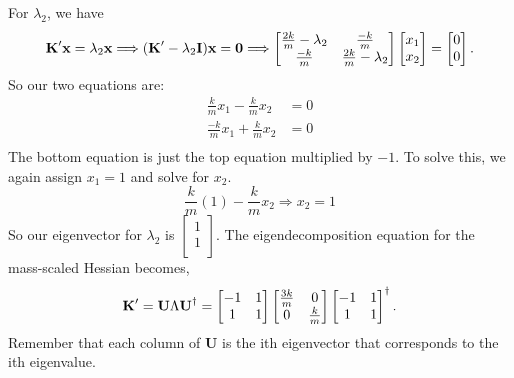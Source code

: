 \documentclass{article}
\newcommand{\be}{\begin{equation}}
\newcommand{\ee}{\end{equation}}
\newcommand{\bK}{\mbox{\bf K}}
\begin{document}
For $\lambda_2$, we have
\be
  \bK' \textbf{x} = \lambda_2 \textbf{x} \Longrightarrow (\bK' - \lambda_2 \textbf{I}) \textbf{x} = \textbf{0} \Longrightarrow
  \begin{bmatrix}
    \frac{2k}{m} - \lambda_2 & \frac{-k}{m} \\
    \frac{-k}{m} & \frac{2k}{m} - \lambda_2 \\
  \end{bmatrix}
  \begin{bmatrix}
    x_1 \\
    x_2 \\
  \end{bmatrix}
  =
  \begin{bmatrix}
    0 \\
    0 \\
  \end{bmatrix} .
\ee
So our two equations are:
\be
  \begin{split}
    \frac{k}{m}x_1 - \frac{k}{m}x_2 &= 0 \\
    \frac{-k}{m}x_1 + \frac{k}{m}x_2 &= 0 \\
  \end{split}
\ee
The bottom equation is just the top equation multiplied by $-1$. To solve this, we again assign $x_1 = 1$ and solve for $x_2$.
\be
  \frac{k}{m}(1) - \frac{k}{m}x_2 \Longrightarrow x_2 = 1
\ee
So our eigenvector for $\lambda_2$ is $\begin{bmatrix} 1 \\ 1 \\ \end{bmatrix}$. The eigendecomposition equation for the mass-scaled Hessian becomes,
\be
  \bK' = \textbf{U} \Lambda \textbf{U}^{\dagger} =
  \begin{bmatrix}
    -1 & 1 \\
    1 & 1 \\
  \end{bmatrix}
  \begin{bmatrix}
    \frac{3k}{m} & 0 \\
    0 & \frac{k}{m} \\
  \end{bmatrix}
  \begin{bmatrix}
    -1 & 1 \\
    1 & 1 \\
  \end{bmatrix}^{\dagger} .
\ee
Remember that each column of \textbf{U} is the ith eigenvector that corresponds to the ith eigenvalue.
\end{document}
